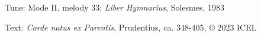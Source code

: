 


\begin{hymnsource}
Tune: Mode II, melody 33; \emph{Liber Hymnarius}, Solesmes, 1983

Text: \emph{Corde natus ex Parentis}, Prudentius, ca. 348-405, © 2023 ICEL
\end{hymnsource}
